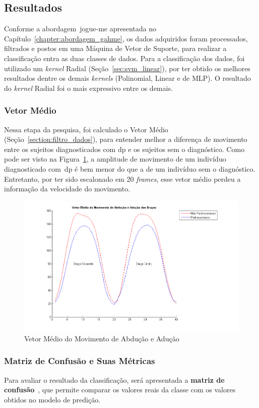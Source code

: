 \subsection{Resultados}
Conforme a abordagem~\ac{jogue-me} apresentada no Capítulo~\ref{chapter:abordagem_gahme}, os dados adquiridos foram processados, filtrados e postos em uma Máquina de Vetor de Suporte, para realizar a classificação entra as duas classes de dados. Para a classificação dos dados, foi utilizado um \textit{kernel} Radial (Seção~\ref{sec:svm_linear}), por ter obtido os melhores resultados dentre os demais \textit{kernels} (Polinomial, Linear e de MLP). O resultado do \textit{kernel} Radial foi o mais expressivo entre os demais. 

\subsubsection{Vetor Médio}
Nessa etapa da pesquisa, foi calculado o Vetor Médio (Seção~\ref{section:filtro_dados}), para entender melhor a diferença de movimento entre os sujeitos diagnosticados com \ac{dp} e os sujeitos sem o diagnóstico. Como pode ser visto na Figura~\ref{fig:vetor_medio_abducao}, a amplitude de movimento de um indivíduo diagnosticado com~\ac{dp} é bem menor do que a de um indivíduo sem o diagnóstico. Entretanto, por ter sido escalonado em 20 \textit{frames}, esse vetor médio perdeu a informação da velocidade do movimento.

\begin{figure}[!htbp]
 \centering
 \includegraphics[scale=0.650]{./img/vetormedioaducao.png}
 \caption{Vetor Médio do Movimento de Abdução e Adução}
 \label{fig:vetor_medio_abducao}
\end{figure}


\subsubsection{Matriz de Confusão e Suas Métricas}
Para avaliar o resultado da classificação, será apresentada a \textbf{matriz de confusão}~\cite{kantardzic2011data}, que permite comparar os valores reais da classe com os valores obtidos no modelo de predição. 

